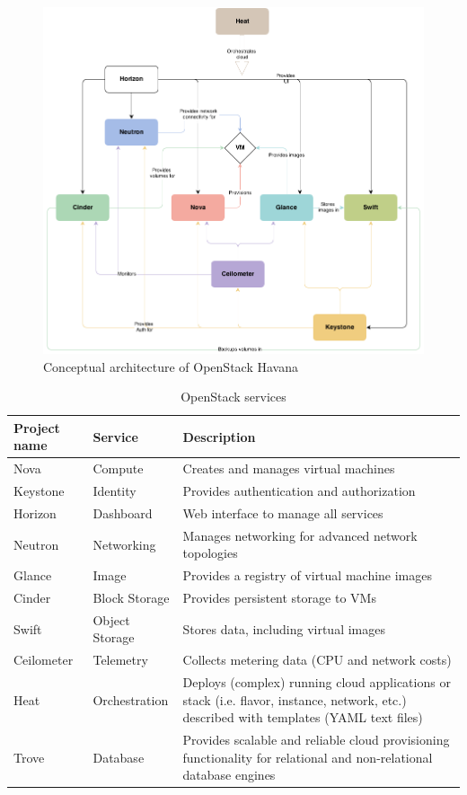\begin{figure}[h]
	\centering
	\includegraphics[scale=0.5]{figures/openstack_havana_conceptual_arch.png}
	\caption{Conceptual architecture of OpenStack Havana \cite{osarch}}
	\label{fig:openstack_services_arch}
\end{figure}

\begin{table}[h]
	\centering
	\begin{tabular}{|l|l|p{9.5cm}|}
		\hline
		\textbf{Project name} & \textbf{Service} & \textbf{Description}\\
		\hline
		Nova & Compute & Creates and manages virtual machines\\
		Keystone & Identity & Provides authentication and authorization\\
		Horizon & Dashboard & Web interface to manage all services\\
		Neutron & Networking & Manages networking for advanced network topologies\\
		Glance & Image & Provides a registry of virtual machine images\\
		Cinder & Block Storage & Provides persistent storage to VMs\\
		Swift & Object Storage & Stores data, including virtual images\\
		Ceilometer & Telemetry & Collects metering data (CPU and network costs)\\
		Heat & Orchestration & Deploys (complex) running cloud applications or stack (i.e. flavor, instance, network, etc.) described with templates (YAML text files)\\
		Trove & Database & Provides scalable and reliable cloud provisioning functionality for relational and non-relational database engines\\
		\hline
	\end{tabular}
	\caption{OpenStack services}
	\label{table:openstack_services_list}
\end{table}

